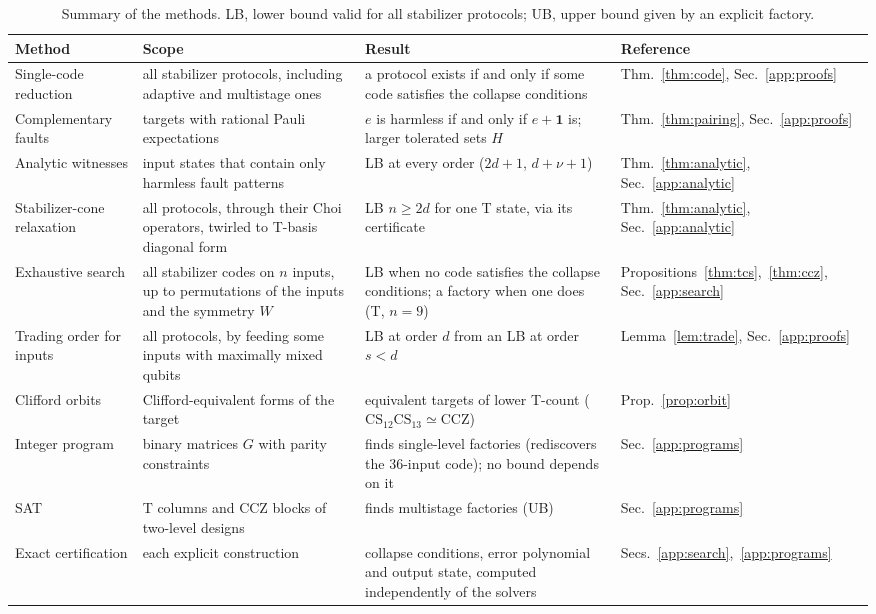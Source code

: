 \documentclass[aps,prl,reprint,twocolumn,amsmath,amssymb,floatfix,nofootinbib,superscriptaddress]{revtex4-2}
\newcommand{\CCZ}{\mathrm{CCZ}}
\newcommand{\CS}{\mathrm{CS}}
\newcommand{\RR}{\raggedright}
\begin{document}
\begin{table}[h]
\caption{Summary of the methods. LB, lower bound valid for all stabilizer protocols; UB, upper bound given by an explicit factory.}
\label{tab:methods}
\begin{ruledtabular}
\begin{tabular}{p{}p{}p{}l}
Method & Scope & Result & Reference \\
\hline
\RR Single-code reduction & \RR all stabilizer protocols, including adaptive and multistage ones & \RR a protocol exists if and only if some code satisfies the collapse conditions & Thm.~\ref{thm:code}, Sec.~\ref{app:proofs} \\
\RR Complementary faults & \RR targets with rational Pauli expectations & \RR $e$ is harmless if and only if $e+\mathbf1$ is; larger tolerated sets $H$ & Thm.~\ref{thm:pairing}, Sec.~\ref{app:proofs} \\
\RR Analytic witnesses & \RR input states that contain only harmless fault patterns & \RR LB at every order ($2d+1$, $d+\nu+1$) & Thm.~\ref{thm:analytic}, Sec.~\ref{app:analytic} \\
\RR Stabilizer-cone relaxation & \RR all protocols, through their Choi operators, twirled to T-basis diagonal form & \RR LB $n\geq2d$ for one T state, via its certificate & Thm.~\ref{thm:analytic}, Sec.~\ref{app:analytic} \\
\RR Exhaustive search & \RR all stabilizer codes on $n$ inputs, up to permutations of the inputs and the symmetry $W$ & \RR LB when no code satisfies the collapse conditions; a factory when one does (T, $n=9$) & Propositions~\ref{thm:tcs},~\ref{thm:ccz}, Sec.~\ref{app:search} \\
\RR Trading order for inputs & \RR all protocols, by feeding some inputs with maximally mixed qubits & \RR LB at order $d$ from an LB at order $s<d$ & Lemma~\ref{lem:trade}, Sec.~\ref{app:proofs} \\
\RR Clifford orbits & \RR Clifford-equivalent forms of the target & \RR equivalent targets of lower T-count ($\CS_{12}\CS_{13}\simeq\CCZ$) & Prop.~\ref{prop:orbit} \\
\RR Integer program & \RR binary matrices $G$ with parity constraints & \RR finds single-level factories (rediscovers the 36-input code); no bound depends on it & Sec.~\ref{app:programs} \\
\RR SAT & \RR T columns and CCZ blocks of two-level designs & \RR finds multistage factories (UB) & Sec.~\ref{app:programs} \\
\RR Exact certification & \RR each explicit construction & \RR collapse conditions, error polynomial and output state, computed independently of the solvers & Secs.~\ref{app:search},~\ref{app:programs} \\
\end{tabular}
\end{ruledtabular}
\end{table}
\end{document}
